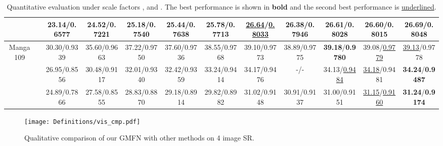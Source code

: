 \documentclass{bmvc2k}
\begin{document}
\begin{table*}[htbp]
{\begin{tabular}{|c|c|c|c|c|c|c|c|c|c|c|c|}
			                                        &               &       23.14/0.6577       &      24.52/0.7221       &      25.18/0.7540      &    25.44/0.7638     &  25.78/0.7713   & \underline{26.64}/\underline{0.8033} &       26.38/0.7946       &             26.61/0.8028             &             26.60/0.8015             &   \textbf {26.69}/\textbf{0.8048}    \\ \hline\hline
			       \multirow{3}{*}{Manga109}        &               &       30.30/0.9339       &      35.60/0.9663       &      37.22/0.9750      &    37.60/0.9736     &  38.55/0.9768   &            {39.10}/0.9773            &       38.89/0.9775       &    \textbf{39.18}/\textbf{0.9780}    &       39.08/\underline{0.9779}       &       \underline{39.13}/0.9778       \\
			                                        &               &       26.95/0.8556       &      30.48/0.9117       &      32.01/0.9340      &    32.42/0.9359     &  33.24/0.9414   &             34.17/0.9476             &           -/-            &       34.13/\underline{0.9484}       &       \underline{34.18}/0.9481       &    \textbf{34.24}/\textbf{0.9487}    \\
			                                        &               &       24.89/0.7866       &      27.58/0.8555       &      28.83/0.8870      &    29.18/0.8914     &  29.82/0.8982   &             31.02/0.9148             &       30.91/0.9137       &             31.00/0.9151             & \underline{31.15}/\underline{0.9160} &    \textbf{31.24}/\textbf{0.9174}    \\ \hline
		\end{tabular}}
		\vspace{-3mm}
		\caption{Quantitative evaluation under scale factors ,  and . The best performance is shown in \textbf{bold} and the second best performance is \underline{underlined}.
			\label{comp_sot_bi}}
		\vspace{-3mm}
		
		
	\end{table*}

	\begin{figure}[H]
		\centering
		\texttt{[image: Definitions/vis\_cmp.pdf]}
		\vspace{-5mm}
		\caption{Qualitative comparison of our GMFN with other methods on 4 image SR.}
		\label{fig:comp}
		\vspace{-4mm}
	\end{figure} 	
\end{document}
